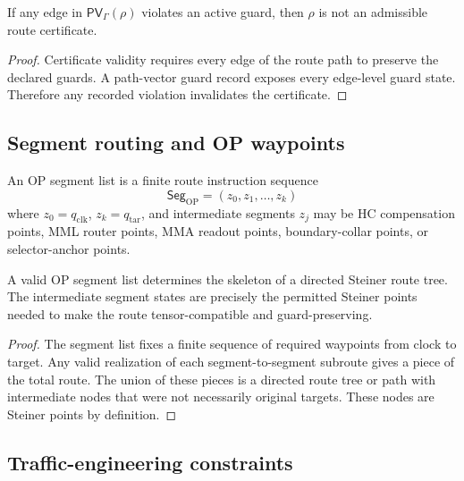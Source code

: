 \begin{lemma}
\label{lem:v410r13-path-vector-guard-rejection}
If any edge in \(\mathsf{PV}_{\Gamma}(\rho)\) violates an active guard, then
\(\rho\) is not an admissible route certificate.
\end{lemma}

\begin{proof}
Certificate validity requires every edge of the route path to preserve the
declared guards. A path-vector guard record exposes every edge-level guard
state. Therefore any recorded violation invalidates the certificate.
\end{proof}

\subsection{Segment routing and OP waypoints}
\label{subsec:v410r13-segment-routing-op-waypoints}

\begin{definition}
\label{def:v410r13-op-segment-list}
An OP segment list is a finite route instruction sequence
\[
 \mathsf{Seg}_{\mathrm{OP}}
 =
 (z_0,z_1,\ldots,z_k)
\]
where \(z_0=q_{\mathrm{clk}}\), \(z_k=q_{\mathrm{tar}}\), and intermediate
segments \(z_j\) may be HC compensation points, MML router points, MMA readout
points, boundary-collar points, or selector-anchor points.
\end{definition}

\begin{proposition}
\label{prop:v410r13-segment-list-gives-steiner-skeleton}
A valid OP segment list determines the skeleton of a directed Steiner route
tree. The intermediate segment states are precisely the permitted Steiner
points needed to make the route tensor-compatible and guard-preserving.
\end{proposition}

\begin{proof}
The segment list fixes a finite sequence of required waypoints from clock to
target. Any valid realization of each segment-to-segment subroute gives a
piece of the total route. The union of these pieces is a directed route tree or
path with intermediate nodes that were not necessarily original targets. These
nodes are Steiner points by definition.
\end{proof}

\subsection{Traffic-engineering constraints}
\label{subsec:v410r13-traffic-engineering-constraints}


